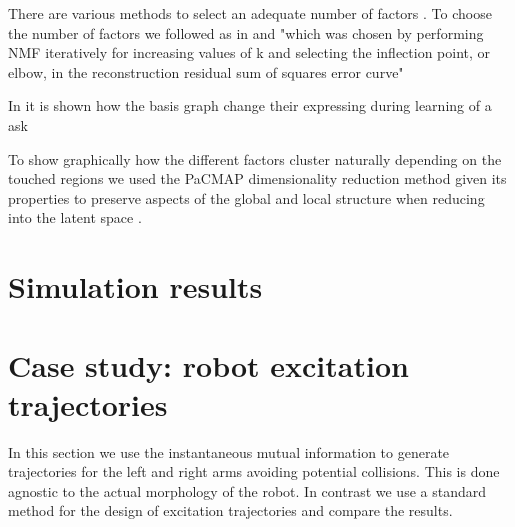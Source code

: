 There are various methods to select an adequate number of factors \cite{Muzzarelli2019RankSelectionNon}. To choose the number of factors we followed as in \cite{Phalen2020Nonnegativematrix} and "which was chosen by performing NMF iteratively for increasing values of k and selecting the inflection point, or elbow, in the reconstruction residual sum of squares
error curve"

In \cite{Stiso2020Learningbraincomputer} it is shown how the basis graph change their expressing during learning of a ask


To show graphically how the different factors cluster naturally depending on the touched regions we used the PaCMAP dimensionality reduction method \cite{Wang2021Understandinghowdimension} given its properties to preserve aspects of the global and local structure when reducing into the latent space \cite{Huang2022Towardscomprehensiveevaluation}.
\section{Simulation results}
\TODO

\section{Case study: robot excitation trajectories}
\TODO
In this section we use the instantaneous mutual information to generate trajectories for the left and right arms avoiding potential collisions. This is done agnostic to the actual morphology of the robot. In contrast we use a standard method for the design of excitation trajectories and compare the results.

